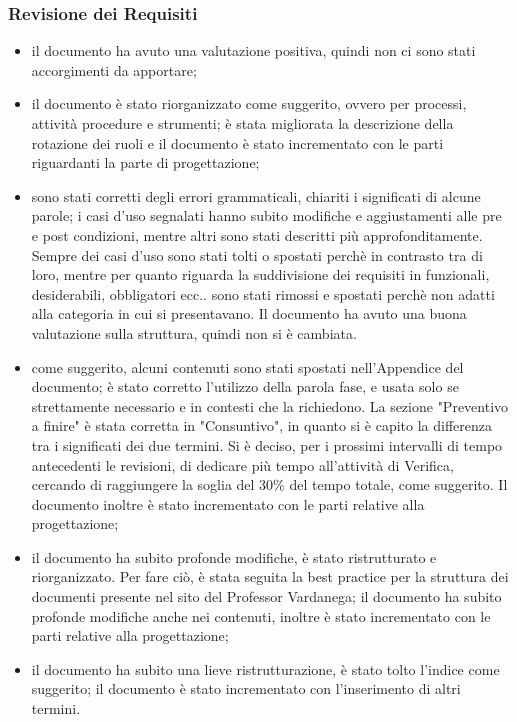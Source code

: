 \subsubsection{Revisione dei Requisiti}
\begin{itemize}
\item {} il documento ha avuto una valutazione positiva, quindi non ci sono stati accorgimenti da apportare;
\item {} il documento è stato riorganizzato come suggerito, ovvero per processi, attività procedure e strumenti; è stata migliorata la descrizione della rotazione dei ruoli e il documento è stato incrementato con le parti riguardanti la parte di progettazione;
\item {} sono stati corretti degli errori grammaticali, chiariti i significati di alcune parole; i casi d'uso segnalati hanno subito modifiche e aggiustamenti alle pre e post condizioni, mentre altri sono stati descritti più approfonditamente. Sempre dei casi d'uso sono stati tolti o spostati perchè in contrasto tra di loro, mentre per quanto riguarda la suddivisione dei requisiti in funzionali, desiderabili, obbligatori ecc.. sono stati rimossi e spostati perchè non adatti alla categoria in cui si presentavano. Il documento ha avuto una buona valutazione sulla struttura, quindi non si è cambiata.
\item {} come suggerito, alcuni contenuti sono stati spostati nell'Appendice del documento; è stato corretto l'utilizzo della parola fase, e usata solo se strettamente necessario e in contesti che la richiedono. La sezione "Preventivo a finire" è stata corretta in "Consuntivo", in quanto si è capito la differenza tra i significati dei due termini. Si è deciso, per i prossimi intervalli di tempo antecedenti le revisioni, di dedicare più tempo all'attività di Verifica, cercando di raggiungere la soglia del 30\% del tempo totale, come suggerito. Il documento inoltre è stato incrementato con le parti relative alla progettazione;
\item {} il documento ha subito profonde modifiche, è stato ristrutturato e riorganizzato. Per fare ciò, è stata seguita la best practice per la struttura dei documenti presente nel sito del Professor Vardanega; il documento ha subito profonde modifiche anche nei contenuti, inoltre è stato incrementato con le parti relative alla progettazione;
\item {} il documento ha subito una lieve ristrutturazione, è stato tolto l'indice come suggerito; il documento è stato incrementato con l'inserimento di altri termini.
\end{itemize}






